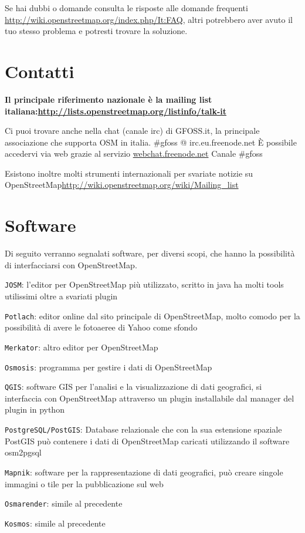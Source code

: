 \documentclass[a4paper,twoside,12pt,]{article}
\newcommand{\osm}{OpenStreetMap\xspace}
\begin{document}
Se hai dubbi o domande consulta le risposte alle domande frequenti \url{http://wiki.openstreetmap.org/index.php/It:FAQ}, altri potrebbero aver avuto il tuo stesso problema e potresti trovare la soluzione.
\section{Contatti}
\textbf{Il principale riferimento nazionale è la mailing list italiana:\newline \url{http://lists.openstreetmap.org/listinfo/talk-it}}

Ci puoi trovare anche nella chat (canale irc) di GFOSS.it, la principale associazione che supporta OSM in italia. \#gfoss @ irc.eu.freenode.net 
È possibile accedervi via web grazie al servizio \url{webchat.freenode.net}  Canale \#gfoss

Esistono inoltre molti strumenti internazionali per svariate notizie su \osm \url{http://wiki.openstreetmap.org/wiki/Mailing_list}

\section{Software}
Di seguito verranno segnalati software, per diversi scopi, che hanno la possibilità di interfacciarsi con \osm.

\texttt{JOSM}: l'editor per \osm più utilizzato, scritto in java ha molti tools utilissimi oltre a svariati plugin

\texttt{Potlach}: editor online dal sito principale di \osm, molto comodo per la possibilità di avere le fotoaeree di Yahoo come sfondo

\texttt{Merkator}: altro editor per \osm

\texttt{Osmosis}: programma per gestire i dati di \osm

\texttt{QGIS}: software GIS per l'analisi e la visualizzazione di dati geografici, si interfaccia con \osm attraverso un plugin installabile dal manager del plugin in python

\texttt{PostgreSQL/PostGIS}: Database relazionale che con la sua estensione spaziale PostGIS può contenere i dati di \osm caricati utilizzando il software osm2pgsql

\texttt{Mapnik}: software per la rappresentazione di dati geografici, può creare singole immagini o tile per la pubblicazione sul web

\texttt{Osmarender}: simile al precedente

\texttt{Kosmos}: simile al precedente
\end{document}
